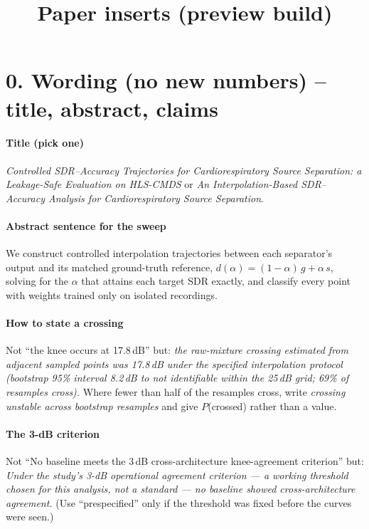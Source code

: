\documentclass[conference]{IEEEtran}
\begin{document}
\title{Paper inserts (preview build)}
\author{}
\maketitle

\section*{0. Wording (no new numbers) -- title, abstract, claims}
\paragraph{Title (pick one)}
\emph{Controlled SDR--Accuracy Trajectories for Cardiorespiratory Source Separation: a Leakage-Safe Evaluation on HLS-CMDS}
\quad or \quad
\emph{An Interpolation-Based SDR--Accuracy Analysis for Cardiorespiratory Source Separation}.

\paragraph{Abstract sentence for the sweep}
We construct controlled interpolation trajectories between each separator's output and its matched ground-truth reference, $d(\alpha) = (1-\alpha)\,g + \alpha\,s$, solving for the $\alpha$ that attains each target SDR exactly, and classify every point with weights trained only on isolated recordings.

\paragraph{How to state a crossing}
Not ``the knee occurs at 17.8\,dB'' but: \emph{the raw-mixture crossing estimated from adjacent sampled points was 17.8\,dB under the specified interpolation protocol (bootstrap 95\% interval 8.2\,dB to not identifiable within the 25\,dB grid; 69\% of resamples cross).} Where fewer than half of the resamples cross, write \emph{crossing unstable across bootstrap resamples} and give $P$(crossed) rather than a value.

\paragraph{The 3-dB criterion}
Not ``No baseline meets the 3\,dB cross-architecture knee-agreement criterion'' but: \emph{Under the study's 3-dB operational agreement criterion --- a working threshold chosen for this analysis, not a standard --- no baseline showed cross-architecture agreement.} (Use ``prespecified'' only if the threshold was fixed before the curves were seen.)
\end{document}
